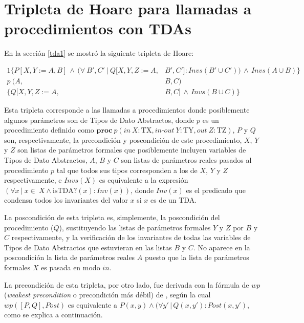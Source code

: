 \chapter{Tripleta de Hoare para llamadas a procedimientos con TDAs}
\label{derivhoare}

En la sección \ref{tda1} se mostró la siguiente tripleta de Hoare:

\begin{alignat}{1}
  \{ P[X,Y:=A,B]\, \land \, (\forall\ B', C'\ |\ Q[X,Y,Z:=A,&B',C'] : Invs(B' \cup C'))\, \land \, Invs(A \cup B)   \} \nonumber \\
  p\  (A,&B,C) \label{eqn:tdatriple2} \\ 
  \{ Q[X,Y,Z:=A,&B,C]\, \land \, Invs(B \cup C)\} \nonumber
\end{alignat}

Esta tripleta corresponde a las llamadas a procedimientos donde 
posiblemente algunos parámetros son de Tipos de Dato Abstractos,
donde $p$ es un procedimiento definido como
$\textbf{proc}\ p (in\ X : \textrm{TX}, in\textrm{-}out\ Y : \textrm{TY}, out\ Z : \textrm{TZ})$, $P$ y $Q$ son, respectivamente, la precondición y poscondición de este procedimiento, $X$, $Y$ y $Z$ son listas de parámetros formales que posiblemente incluyen
variables de Tipos de Dato Abstractos, $A$, $B$ y $C$ son listas de parámetros reales pasados al procedimiento $p$ tal que todos sus tipos corresponden a los de $X$, $Y$ y $Z$ respectivamente, e $Invs(X)$ es equivalente a la expresión $(\forall x\ |\ x \in\ X \land \textrm{isTDA?}(x) : Inv(x) )$, donde $Inv(x)$ es el predicado que condensa todos los
invariantes del valor $x$ si $x$ es de un TDA.

La poscondición de esta tripleta es, simplemente, la poscondición del procedimiento ($Q$), sustituyendo las listas de parámetros formales $Y$ y $Z$ por $B$ y $C$ respectivamente, y la verificación de los invariantes de todas las variables de Tipos de Dato Abstractos que estuvieran en las listas $B$ y $C$. No aparece en la poscondición la lista de parámetros reales $A$ puesto que la lista de parámetros formales $X$ es pasada en modo $in$.

La precondición de esta tripleta, por otro lado, fue derivada con la fórmula de $wp$ (\textit{weakest precondition} o precondición más débil) de \cite{flaviani}, según la cual $wp([P, Q], Post)$ es equivalente a $P (x,y) \land (\forall y'\,|\,Q(x, y') : Post (x, y')$, como se explica a continuación.


